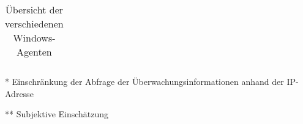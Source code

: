 \begin{table}[!cht]
\begin{threeparttable}
\begin{tabular}{l p{1.3cm} l p{1.3cm} l p{1.3cm} l p{1.3cm} l p{1.3cm} l p{1.3cm} l p{1.3cm} p{1.3cm} p{1.3cm} p{1.3cm} p{1.3cm}}
\end{tabular}
\begin{tablenotes}\footnotesize
        \item[*] Einschränkung der Abfrage der Überwachungsinformationen anhand der \gls{IP}-Adresse
        \item[**] Subjektive Einschätzung
    \end{tablenotes}
\caption{Übersicht der verschiedenen Windows-Agenten}
\label{tab:winagents}
\end{threeparttable}
\end{table}
